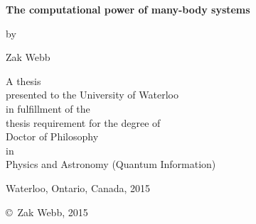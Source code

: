 

\pagestyle{empty}

\begin{titlepage}
        \begin{center}
        \vspace*{1.0cm}

        \Huge
        {\bf The computational power of many-body systems}

        \vspace*{1.0cm}

        \normalsize
        by \\

        \vspace*{1.0cm}

        \Large
        Zak Webb \\

        \vspace*{3.0cm}

        \normalsize
        A thesis \\
        presented to the University of Waterloo \\ 
        in fulfillment of the \\
        thesis requirement for the degree of \\
        Doctor of Philosophy \\
        in \\
        Physics and Astronomy (Quantum Information) \\

        \vspace*{2.0cm}

        Waterloo, Ontario, Canada, 2015 \\

        \vspace*{1.0cm}

        \copyright\ Zak Webb, 2015 \\
        \end{center}
\end{titlepage}

